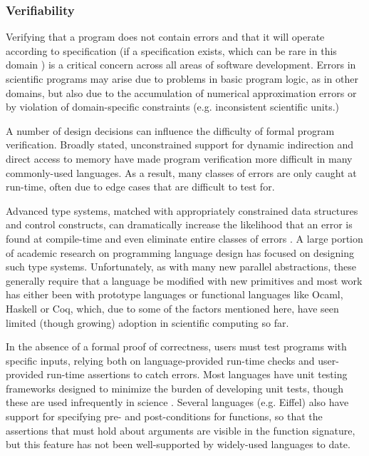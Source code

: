 \documentclass[12pt]{article}
\begin{document}
\subsubsection{Verifiability}\label{verifiability}
Verifying that a program does not contain errors and that it will operate according to specification (if a specification exists, which can be rare in this domain \cite{oai:open.ac.uk.OAI2:17673}) is a critical concern across all areas of software development. Errors in scientific programs may arise due to problems in basic program logic, as in other domains, but also due to the accumulation of  numerical approximation errors or by violation of domain-specific constraints (e.g. inconsistent scientific units.)

A number of design decisions can influence the difficulty of formal program verification. Broadly stated, unconstrained support for dynamic indirection and direct access to memory have made program verification more difficult in many commonly-used languages. As a result, many classes of errors are only caught at run-time, often due to edge cases that are difficult to test for.

Advanced type systems, matched with appropriately constrained data structures and control constructs, can dramatically increase the likelihood that an error is found at compile-time and even eliminate entire classes of errors \cite{tapl}. A large portion of academic research on programming language design has focused on designing such type systems. Unfortunately, as with many new parallel abstractions, these generally require that a language be modified with new primitives and most work has either been with prototype languages or functional languages like Ocaml, Haskell or Coq, which, due to some of the factors mentioned here, have seen  limited (though growing) adoption in scientific computing so far.

In the absence of a formal proof of correctness, users must test programs with specific inputs, relying both on language-provided run-time checks and user-provided run-time assertions to catch errors. Most languages have unit testing frameworks designed to minimize the burden of developing unit tests, though these are used infrequently in science \cite{oai:open.ac.uk.OAI2:17673, hannay2009scientists}. Several languages (e.g. Eiffel) also have support for specifying pre- and post-conditions for functions, so that the assertions that must hold about arguments are visible in the function signature, but this feature has not been well-supported by widely-used languages to date.
\end{document}
